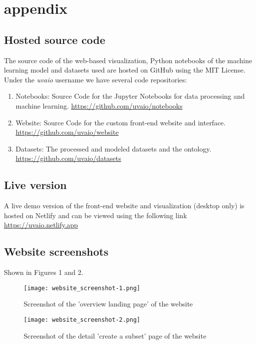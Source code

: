 \section{appendix}

\subsection{Hosted source code}

The source code of the web-based visualization, Python notebooks of the machine learning model and datasets used are hosted on GitHub using the MIT License. Under the \textit{uvaio} username we have several code repositories:

\begin{enumerate}
  \item Notebooks: Source Code for the Jupyter Notebooks for data processing and machine learning. \underline{https://github.com/uvaio/notebooks}
  \item Website: Source Code for the custom front-end website and interface. \underline{https://github.com/uvaio/website}
  \item Datasets: The processed and modeled datasets and the ontology. \underline{https://github.com/uvaio/datasets}
\end{enumerate}

\subsection{Live version}
A live demo version of the front-end website and visualization (desktop only) is hosted on Netlify and can be viewed using the following link \underline{https://uvaio.netlify.app}


\subsection{Website screenshots}

Shown in Figures 1 and 2.

 \begin{figure*}[!]
    \centering
    \texttt{[image: website\_screenshot-1.png]}
    \caption{Screenshot of the 'overview landing page' of the  website}
    \label{fig:summary}
\end{figure*}

 \begin{figure*}[!]
    \centering
    \texttt{[image: website\_screenshot-2.png]}
    \caption{Screenshot of the detail 'create a subset' page of the website}
    \label{fig:subset}
\end{figure*}
